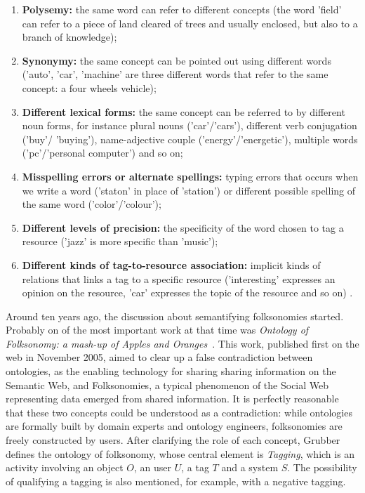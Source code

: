 \begin{citacao}
\begin{enumerate}
\item \textbf{Polysemy:} the same word can refer to different concepts (the word ’field’ can refer to a piece of land
cleared of trees and usually enclosed, but also to a branch of knowledge);
\item \textbf{Synonymy:} the same concept can be pointed out using different words (’auto’, ’car’, ’machine’ are three different words that refer to the same concept: a four wheels vehicle);
\item \textbf{Different lexical forms:} the same concept can be referred to by different noun forms, for instance plural nouns (’car’/’cars’), different verb conjugation (’buy’/ ’buying’), name-adjective couple (’energy’/’energetic’), multiple words (’pc’/’personal computer’) and so on;
\item \textbf{Misspelling errors or alternate spellings:} typing errors that occurs when we write a word (’staton’ in
place of ’station’) or different possible spelling of the same word (’color’/’colour’);
\item \textbf{Different levels of precision:} the specificity of the word chosen to tag a resource (’jazz’ is more specific than ’music’);
\item \textbf{Different kinds of tag-to-resource association:} implicit kinds of relations that links a tag to a specific resource (’interesting’ expresses an opinion on the resource, ’car’ expresses the topic of the resource and so on) \cite{Marchetti2007}.
\end{enumerate}
\end{citacao}

Around ten years ago, the discussion about semantifying folksonomies started.
Probably on of the most important work at that time was \emph{Ontology of Folksonomy: a mash-up of Apples and Oranges}~\cite{Grubber2007}.
This work, published first on the web in November 2005, aimed to clear up a false contradiction between ontologies, as the enabling technology for sharing sharing information on the Semantic Web, and Folksonomies, a typical phenomenon of the Social Web representing data emerged from shared information.
It is perfectly reasonable that these two concepts could be understood as a contradiction: while ontologies are formally built by domain experts and ontology engineers, folksonomies are freely constructed by users.
After clarifying the role of each concept, Grubber defines the ontology of folksonomy, whose central element is \emph{Tagging}, which is an activity involving an object $O$, an user $U$, a tag $T$ and a system $S$.
The possibility of qualifying a tagging is also mentioned, for example, with a negative tagging.

